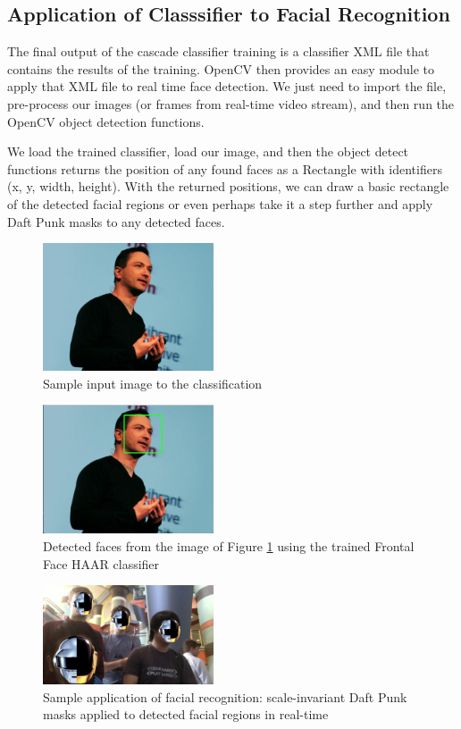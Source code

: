 \documentclass[journal]{IEEEtran}
\begin{document}
\subsection{Application of Classsifier to Facial Recognition}
The final output of the cascade classifier training is a classifier XML file that contains the results of the training. OpenCV then provides an easy module to apply that XML file to real time face detection. We just need to import the file, pre-process our images (or frames from real-time video stream), and then run the OpenCV object detection functions.
\par We load the trained classifier, load our image, and then the object detect functions returns the position of any found faces as a Rectangle with identifiers (x, y, width, height). With the returned positions, we can draw a basic rectangle of the detected facial regions or even perhaps take it a step further and apply Daft Punk masks to any detected faces.
\begin{figure}[H]
	\centering
	\includegraphics[width=0.45\textwidth]{richb.jpg}
	\caption{Sample input image to the classification}
    \label{richb}
\end{figure}
\begin{figure}[H]
	\centering
	\includegraphics[width=0.45\textwidth]{richb_face_detected.png}
	\caption{Detected faces from the image of Figure \ref{richb} using the trained Frontal Face HAAR classifier}
    \label{richb-face-detected}
\end{figure}
\begin{figure}[h]
	\centering
	\includegraphics[width=0.45\textwidth]{daft_punk_masks.png}
	\caption{Sample application of facial recognition: scale-invariant Daft Punk masks applied to detected facial regions in real-time}
    \label{daft-punk-masks}
\end{figure}
\end{document}
